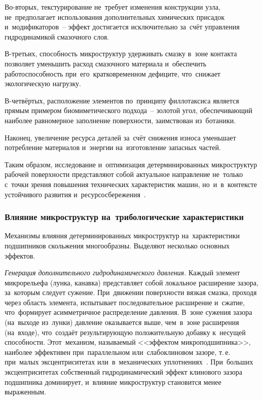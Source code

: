 Во-вторых, текстурирование не~требует изменения конструкции узла, не~предполагает использования дополнительных химических присадок и~модификаторов~-- эффект достигается исключительно за~счёт управления гидродинамикой смазочного слоя.

В-третьих, способность микроструктур удерживать смазку в~зоне контакта позволяет уменьшить расход смазочного материала и~обеспечить работоспособность при~его~кратковременном дефиците, что~снижает экологическую нагрузку.

В-четвёртых, расположение элементов по~принципу филлотаксиса является прямым примером биомиметического подхода~-- золотой угол, обеспечивающий наиболее равномерное заполнение поверхности, заимствован из~ботаники.

Наконец, увеличение ресурса деталей за~счёт снижения износа уменьшает потребление материалов и~энергии на~изготовление запасных частей.

Таким образом, исследование и~оптимизация детерминированных микроструктур рабочей поверхности представляют собой актуальное направление не~только с~точки зрения повышения технических характеристик машин, но~и~в~контексте устойчивого развития и~ресурсосбережения~\cite{bashmur2024b,bashmur2024a}.

\subsubsection{Влияние микроструктур на~трибологические характеристики}

Механизмы влияния детерминированных микроструктур на~характеристики подшипников скольжения многообразны. Выделяют несколько основных эффектов.

\textit{Генерация дополнительного гидродинамического давления.} Каждый элемент микрорельефа (лунка, канавка) представляет собой локальное расширение зазора, за~которым следует сужение. При~движении поверхности вязкая смазка, проходя через область элемента, испытывает последовательное расширение и~сжатие, что~формирует асимметричное распределение давления. В~зоне сужения зазора (на~выходе из~лунки) давление оказывается выше, чем~в~зоне расширения (на~входе), что~создаёт результирующую положительную добавку к~несущей способности. Этот~механизм, называемый <<эффектом микроподшипника>>, наиболее эффективен при~параллельном или~слабоклиновом зазоре, т.\,е. при~малых эксцентриситетах или~в~механических уплотнениях~\cite{senatore2018,galda2019}. При~больших эксцентриситетах собственный гидродинамический эффект клинового зазора подшипника доминирует, и~влияние микроструктур становится менее выраженным.

